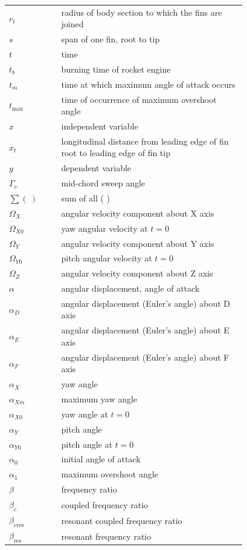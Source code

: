 \begin{longtable}{@{}l p{0.78\linewidth}@{}}
$r_t$ & radius of body section to which the fins are joined \\
$s$ & span of one fin, root to tip \\
$t$ & time \\
$t_b$ & burning time of rocket engine \\
$t_m$ & time at which maximum angle of attack occurs \\
$t_{\max}$ & time of occurrence of maximum overshoot angle \\
$x$ & independent variable \\
$x_t$ & longitudinal distance from leading edge of fin root to leading edge of fin tip \\
$y$ & dependent variable \\
$\Gamma_c$ & mid-chord sweep angle \\
$\sum(\ )$ & sum of all ( ) \\
$\Omega_X$ & angular velocity component about X axis \\
$\Omega_{X0}$ & yaw angular velocity at $t = 0$ \\
$\Omega_Y$ & angular velocity component about Y axis \\
$\Omega_{Y0}$ & pitch angular velocity at $t = 0$ \\
$\Omega_Z$ & angular velocity component about Z axis \\
$\alpha$ & angular displacement, angle of attack \\
$\alpha_D$ & angular displacement (Euler's angle) about D axis \\
$\alpha_E$ & angular displacement (Euler's angle) about E axis \\
$\alpha_F$ & angular displacement (Euler's angle) about F axis \\
$\alpha_X$ & yaw angle \\
$\alpha_{Xm}$ & maximum yaw angle \\
$\alpha_{X0}$ & yaw angle at $t = 0$ \\
$\alpha_Y$ & pitch angle \\
$\alpha_{Y0}$ & pitch angle at $t = 0$ \\
$\alpha_0$ & initial angle of attack \\
$\alpha_1$ & maximum overshoot angle \\
$\beta$ & frequency ratio \\
$\beta_c$ & coupled frequency ratio \\
$\beta_{\mathrm{cres}}$ & resonant coupled frequency ratio \\
$\beta_{\mathrm{res}}$ & resonant frequency ratio \\

\end{longtable}
